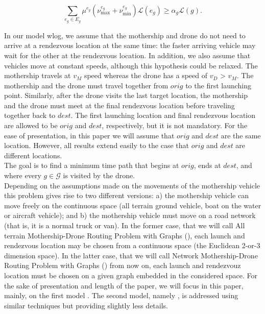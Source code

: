 \begin{equation}\label{eq:alpha-G}\tag{$\alpha$-G}
\sum_{e_g\in E_g} \mu^{e_g}(\nu_\text{max}^{e_g} + \nu_\text{min}^{e_g})\mathcal L(e_g)\geq \alpha_g\mathcal L(g).
\end{equation}

\noindent
In our model wlog, we assume  that the mothership and drone do not need to arrive at a rendezvous location at the same time: the
faster arriving vehicle may wait for the other at the rendezvous location. In addition, we also assume that vehicles move at constant speeds, although this hypothesis could be relaxed. The mothership travels at $v_M$ speed whereas the drone has a speed of $v_D$ > $v_M$. The mothership and the drone must travel together from $orig$ to the first launching point. Similarly, after the drone visits the last target location, the mothership and the drone must meet at the final rendezvous location before traveling together back to $dest$. The first launching location and final rendezvous location are allowed to be $orig$ and $dest$, respectively, but it is not mandatory. For the ease of presentation, in this paper we will assume that $orig$ and $dest$ are the same location. However, all results extend easily to the case that $orig$ and $dest$ are different locations.\\
\noindent
The goal is to find a minimum time path that begins at $orig$, ends at $dest$, and where
every $g \in \mathcal G$ is visited by the drone.\\
\noindent
Depending on the assumptions made on the movements of the mothership vehicle this problem gives rise to two different versions: a) the mothership vehicle can move freely on the continuous space (all terrain ground vehicle, boat on the water or aircraft vehicle); and b) the mothership vehicle must move on a road network (that is, it is a normal truck or van). In the former case, that we will call All terrain Mothership-Drone Routing Problem with Graphs (\AMD), each launch and rendezvous location may be chosen from a continuous space (the Euclidean 2-or-3 dimension space). In the latter case, that we will call Network Mothership-Drone Routing Problem with Graphs (\NMD) from now on, each launch and rendezvouz location must be chosen on a given graph embedded in the considered space. For the sake of presentation and length  of the paper, we will focus in this paper, mainly, on the first model \AMD. The second model, namely \NMD, is addressed using similar techniques but providing slightly less details.


